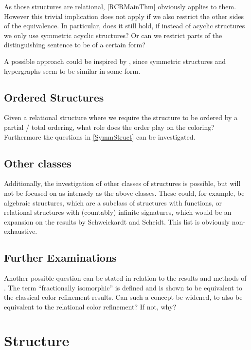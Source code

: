 \documentclass[a4paper,11pt,DIV=15]{scrartcl} %
\theoremstyle{plain}
\theoremstyle{definition}
\begin{document}
As those structures are relational, \cref{RCRMainThm} obviously applies to them.
However this trivial implication does not apply if we also restrict the other sides of the equivalence.
In particular, does it still hold, if instead of acyclic structures we only use symmetric acyclic structures?
Or can we restrict parts of the distinguishing sentence to be of a certain form?

A possible approach could be inspired by \cite{scheidt2023counting}, since symmetric structures and hypergraphs seem to be similar in some form.
\label{SymmStruct}

\subsection{Ordered Structures}

Given a relational structure where we require the structure to be ordered by a partial / total ordering, what role does the order play on the coloring?
Furthermore the questions in \cref{SymmStruct} can be investigated.

\subsection{Other classes}

Additionally, the investigation of other classes of structures is possible, but will not be focused on as intensely as the above classes.
These could, for example, be algebraic structures, which are a subclass of structures with functions, or relational structures with (countably) infinite signatures, which would be an expansion on the results by Schweickardt and Scheidt.
This list is obviously non-exhaustive.

\subsection{Further Examinations}

Another possible question can be stated in relation to the results and methods of \cite{dell2018lov}.
The term ``fractionally isomorphic'' is defined and is shown to be equivalent to the classical color refinement results.
Can such a concept be widened, to also be equivalent to the relational color refinement?
If not, why?

\section{Structure}
\end{document}
